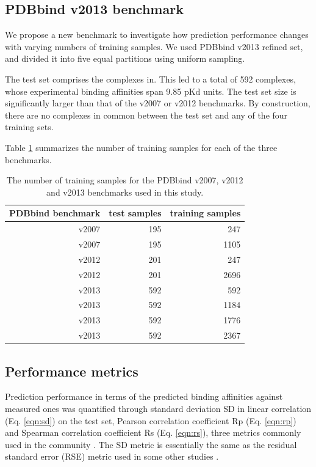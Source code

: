 \documentclass[journal=jacsat,manuscript=article]{achemso}
\begin{document}
\subsection{PDBbind v2013 benchmark}

We propose a new benchmark to investigate how prediction performance changes with varying numbers of training samples. We used PDBbind v2013 refined set, and divided it into five equal partitions using uniform sampling.

The test set comprises the complexes in. This led to a total of 592 complexes, whose experimental binding affinities span 9.85 pKd units. The test set size is significantly larger than that of the v2007 or v2012 benchmarks. By construction, there are no complexes in common between the test set and any of the four training sets.


Table \ref{tbl:benchmarks} summarizes the number of training samples for each of the three benchmarks.

\begin{table}
\caption{The number of training samples for the PDBbind v2007, v2012 and v2013 benchmarks used in this study.}
\label{tbl:benchmarks}
\begin{tabular}{rrr}
\hline
PDBbind benchmark & test samples & training samples\\
\hline
v2007 & 195 &  247\\
v2007 & 195 & 1105\\
v2012 & 201 &  247\\
v2012 & 201 & 2696\\
v2013 & 592 &  592\\
v2013 & 592 & 1184\\
v2013 & 592 & 1776\\
v2013 & 592 & 2367\\
\hline
\end{tabular}
\end{table}

\subsection{Performance metrics}

Prediction performance in terms of the predicted binding affinities against measured ones was quantified through standard deviation SD in linear correlation (Eq. \ref{eqn:sd}) on the test set, Pearson correlation coefficient Rp (Eq. \ref{eqn:rp}) and Spearman correlation coefficient Rs (Eq. \ref{eqn:rs}), three metrics commonly used in the community \cite{1313}. The SD metric is essentially the same as the residual standard error (RSE) metric used in some other studies \cite{963}.
\end{document}
